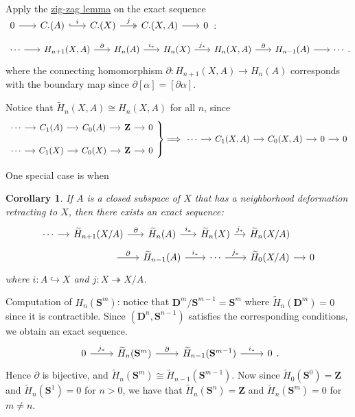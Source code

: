 \documentclass[11pt]{article}
\theoremstyle{definition}
\theoremstyle{plain}
\newtheorem*{corollary}{Corollary}
\theoremstyle{remark}
\newenvironment{rcases}
  {\left.\begin{aligned}}
  {\end{aligned}\right\rbrace}
\newcommand{\Z}{\mathbf{Z}}
\begin{document}
Apply the \hyperref[zig-zag lemma]{zig-zag lemma} on the exact sequence $\begin{tikzcd}[column sep=scriptsize]
0\arrow{r}&C.(A)\arrow[hookrightarrow]{r}{i}&C.(X)\arrow[twoheadrightarrow]{r}{j}&C.(X,A)\arrow{r}&0
\end{tikzcd}$:
\[\begin{tikzcd}[column sep=scriptsize]
\cdots\arrow{r}&H_{n+1}(X,A)\arrow{r}{\partial}&H_n(A)\arrow{r}{i_\ast}&H_n(X)\arrow{r}{j_\ast}&H_n(X,A)\arrow{r}{\partial}&H_{n-1}(A)\arrow{r}&\cdots
\end{tikzcd}.\]
where the connecting homomorphism $\partial:H_{n+1}(X,A)\to H_n(A)$ corresponds with the boundary map since $\partial[\alpha]=[\partial\alpha]$.

Notice that $\widetilde{H}_n(X,A)\cong H_n(X,A)$ for all $n$, since
\[\begin{rcases}\begin{tikzcd}[column sep=small, row sep=small]
\cdots\arrow{r}&C_1(A)\arrow{r}&C_0(A)\arrow[r]&\Z\arrow[r]&0\\
\cdots\arrow{r}&C_1(X)\arrow{r}&C_0(X)\arrow[r]&\Z\arrow[r]&0
\end{tikzcd}\end{rcases}\Longrightarrow\begin{tikzcd}[column sep=small, row sep=small]
\cdots\arrow{r}&C_1(X,A)\arrow{r}&C_0(X,A)\arrow[r]&0\arrow[r]&0
\end{tikzcd}\]

One special case is when

\begin{corollary}
If $A$ is a closed subspace of $X$ that has a neighborhood deformation retracting to $X$, then there exists an exact sequence:
\[\begin{tikzcd}[row sep=tiny, column sep=small]
\cdots\arrow{r}&\widetilde{H}_{n+1}(X/A)\arrow{r}{\partial}&\widetilde{H}_n(A)\arrow{r}{i_\ast}&\widetilde{H}_n(X)\arrow{r}{j_\ast}&\widetilde{H}_n(X/A)\\
&\quad\quad\quad\arrow{r}{\partial}&\widetilde{H}_{n-1}(A)\arrow{r}{i_\ast}&\cdots\arrow{r}{j_\ast}&\widetilde{H}_0(X/A)\arrow{r}&0
\end{tikzcd}\]
where $i:A\hookrightarrow X$ and $j:X\twoheadrightarrow X/A$.
\end{corollary}

Computation of $H_n(\mathbf{S}^m)$: notice that $\mathbf{D}^m/\mathbf{S}^{m-1}=\mathbf{S}^m$ where $\widetilde{H}_n(\mathbf{D}^m)=0$ since it is contractible. Since $(\mathbf{D}^n,\mathbf{S}^{n-1})$ satisfies the corresponding conditions, we obtain an exact sequence.
\[\begin{tikzcd}
0\arrow{r}{j_\ast}&\widetilde{H}_n(\mathbf{S}^m)\arrow{r}{\partial}&\widetilde{H}_{n-1}(\mathbf{S}^{m-1})\arrow{r}{i_\ast}&0
\end{tikzcd}.\]
Hence $\partial$ is bijective, and $\widetilde{H}_n(\mathbf{S}^m)\cong\widetilde{H}_{n-1}(\mathbf{S}^{m-1})$. Now since $\widetilde{H}_0(\mathbf{S}^0)=\Z$ and $\widetilde{H}_n(\mathbf{S}^1)=0$ for $n>0$, we have that $\widetilde{H}_n(\mathbf{S}^n)=\Z$ and $\widetilde{H}_n(\mathbf{S}^m)=0$ for $m\neq n$.
\end{document}
